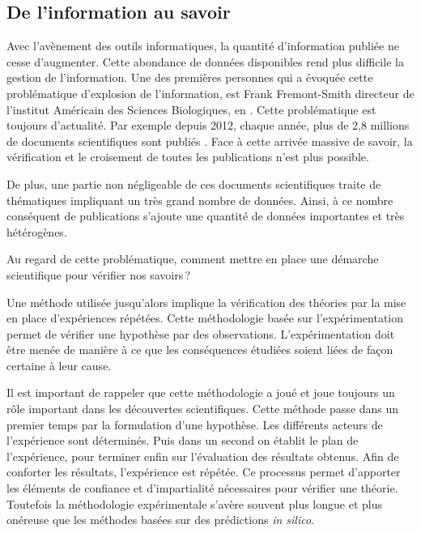 \begin{refsegment}
\chapter*{De l'information au savoir}
Avec l'avènement des outils informatiques, la quantité d'information publiée ne cesse d'augmenter. Cette abondance de données disponibles rend plus difficile la gestion de l'information. Une des premières personnes qui a évoquée cette problématique d'explosion de l'information, est Frank Fremont-Smith directeur de l'institut Américain des Sciences Biologiques,  en \citeyear{fremont61}  \cite{fremont61}. Cette problématique est toujours d'actualité. Par exemple depuis 2012, chaque année, plus de 2,8 millions de documents scientifiques sont publiés  \cite{oecd2016} . Face à cette arrivée massive de savoir, la vérification et le croisement de toutes les publications n'est plus possible.

De plus, une partie non négligeable de ces documents scientifiques traite de thématiques impliquant un très grand nombre de données. Ainsi, à ce nombre conséquent de publications s'ajoute une quantité de données importantes et très hétérogènes.

Au regard de cette problématique, comment mettre en place une démarche scientifique pour vérifier nos savoirs ?

Une méthode utilisée jusqu'alors implique la vérification des théories par la mise en place d'expériences répétées. Cette méthodologie basée sur l'expérimentation permet de vérifier une hypothèse par des observations. L'expérimentation doit être menée de manière à ce que les conséquences étudiées soient liées de façon certaine à leur cause.

Il est important de rappeler que cette méthodologie a joué et joue toujours un rôle important dans les découvertes scientifiques. Cette méthode passe dans un premier temps par la formulation d'une hypothèse. Les différents acteurs de l'expérience sont déterminés. Puis dans un second on établit le plan de l'expérience, pour terminer enfin sur l'évaluation des résultats obtenus. Afin de conforter les résultats, l'expérience est répétée. Ce processus permet d'apporter les éléments de confiance et d'impartialité nécessaires pour vérifier une théorie. Toutefois la méthodologie expérimentale s'avère souvent plus longue et plus onéreuse que les méthodes basées sur des prédictions \textit{in silico}. 


\end{refsegment}

